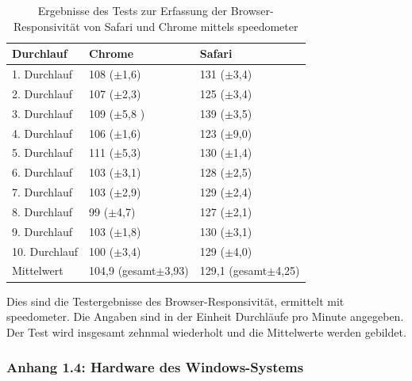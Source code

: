 \documentclass[a4paper]{scrartcl}
\begin{document}
\begin{table}[H]
	\centering
	\caption{Ergebnisse des Tests zur Erfassung der Browser-Responsivität von Safari und Chrome mittels speedometer}
	\begin{center}
		\begin{tabularx}{\linewidth}{| l || X | X |}
			\hline
			Durchlauf & Chrome & Safari \\ 
			\hline \hline
			1. Durchlauf & 108 (\( \pm \)1,6) & 131 (\( \pm \)3,4) \\
			\hline
			2. Durchlauf & 107 (\( \pm \)2,3) & 125 (\( \pm \)3,4) \\
			\hline
			3. Durchlauf & 109 (\( \pm \)5,8 ) & 139 (\( \pm \)3,5) \\
			\hline
			4. Durchlauf & 106 (\( \pm \)1,6) & 123 (\( \pm \)9,0) \\
			\hline
			5. Durchlauf & 111 (\( \pm \)5,3) & 130 (\( \pm \)1,4) \\
			\hline
			6. Durchlauf & 103 (\( \pm \)3,1) & 128 (\( \pm \)2,5) \\
			\hline
			7. Durchlauf & 103 (\( \pm \)2,9) & 129 (\( \pm \)2,4) \\
			\hline
			8. Durchlauf & 99 (\( \pm \)4,7) & 127 (\( \pm \)2,1) \\
			\hline
			9. Durchlauf & 103 (\( \pm \)1,8) & 130 (\( \pm \)3,1) \\
			\hline
			10. Durchlauf & 100 (\( \pm \)3,4) & 129 (\( \pm \)4,0) \\
			\hline \hline
			Mittelwert & 104,9 (gesamt\( \pm \)3,93) & 129,1 (gesamt\( \pm \)4,25) \\ 
			\hline
		\end{tabularx}
	\end{center}
	\justifying
	\small	
	Dies sind die Testergebnisse des Browser-Responsivität, ermittelt mit speedometer. Die Angaben sind in der Einheit Durchläufe pro Minute angegeben. Der Test wird insgesamt zehnmal wiederholt und die Mittelwerte werden gebildet.
\end{table}

\newpage

\subsubsection*{Anhang 1.4: Hardware des Windows-Systems}
\end{document}
